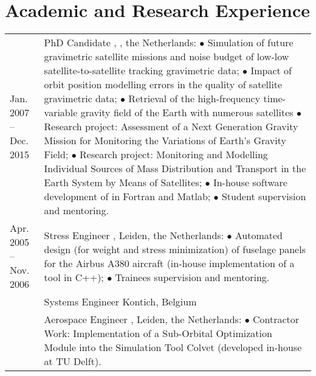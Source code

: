 \documentclass[a4paper]{article}
\newcommand{\dynhref}[2]{%
  \iftoggle{expliciturl}{%
    #2 (\href{#1}{\texttt{\detokenize{#1}}})%
  }{%
    \href{#1}{#2}%
  }%
}
\newcommand{\procv}[2]{\iftoggle{professionalcv}{#1}{#2}}
\newlength{\listskipbig}
\newenvironment{cvsection}[2]{
  \setlength{\floatsep}{0pt}
  \setlength{\textfloatsep}{0pt}
  \setlength{\intextsep}{0pt}
  \section*{#1}
  \begin{longtable}{lp{#2}}
}{
  \end{longtable}
}
\begin{document}
\begin{cvsection}{Academic and Research Experience}{10.8cm}
Jan. 2007 -- Dec. 2015
  & PhD Candidate\newline
    \dynhref{http://tinyurl.com/GRS-TUDelft}{Geoscience \& Remote Sensing}, \dynhref{http://www.tudelft.nl/}{Delft University of Technology}, the Netherlands:\newline
    $\bullet$ Simulation of future gravimetric satellite missions and noise budget of low-low satellite-to-satellite tracking gravimetric data;\newline
    $\bullet$ Impact of orbit position modelling errors in the quality of satellite gravimetric data;\newline
    $\bullet$ Retrieval of the high-frequency time-variable gravity field of the Earth with numerous satellites
    $\bullet$ Research project: Assessment of a Next Generation Gravity Mission for Monitoring the Variations of Earth's Gravity Field;\newline
    $\bullet$ Research project: Monitoring and Modelling Individual Sources of Mass Distribution and Transport in the Earth System by Means of Satellites;\newline
    $\bullet$ In-house software development of in Fortran and Matlab;\newline
    $\bullet$ Student supervision and mentoring.
    \\[\listskipbig]


Apr. 2005 -- Nov. 2006
  & Stress Engineer\newline
    \dynhref{http://www.globaltechnics.nl/}{Global Technics}, Leiden, the Netherlands:\newline
    $\bullet$ Automated design (for weight and stress minimization) of fuselage panels for the Airbus A380 aircraft (in-house implementation of a tool in C++);\newline
    $\bullet$ Trainees supervision and mentoring.
    \\[\listskipbig]

\procv{
6/2005 -- 7/2005 & Systems Engineer \newline
                 \dynhref{http://www.reduct.net}{Reduct}\newline
                   Kontich, Belgium\\[\listskipbig]
}{}

Oct. 2004 -- Jan. 2005
  & Aerospace Engineer\newline
    \dynhref{http://www.delta-utec.com/}{Delta-Utec}, Leiden, the Netherlands:\newline
      $\bullet$ Contractor Work: Implementation of a Sub-Orbital Optimization Module into the Simulation Tool Colvet (developed in-house at TU Delft).
    \\[\listskipbig]


\end{cvsection}
\end{document}
